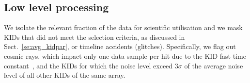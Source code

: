 \subsection{Low level processing}
\label{se:ll_proc}
We isolate the relevant fraction of the data for scientific
utilisation and {\lp we mask KIDs that did not meet the selection criteria, as
discussed in Sect.~\ref{se:avg_kidpar},} or
timeline accidents (glitches). Specifically, we flag out cosmic rays,
which impact only one data sample per hit due to the KID fast time
constant~\citep{Catalano2014}, %
and the KIDs for which the noise level exceed $3\sigma$ of the average
noise level of all other KIDs of the same array.  
%
%


